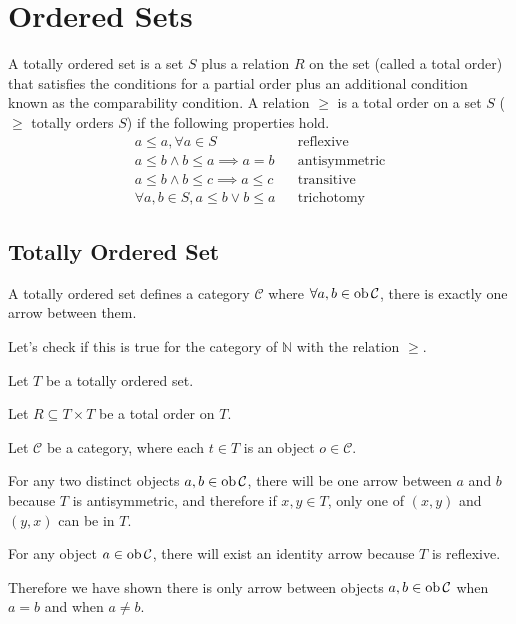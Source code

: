 \section{Ordered Sets}
\begin{definition}
A totally ordered set is a set $S$ plus a relation $R$ on the set (called a total
order) that satisfies the conditions for a partial order plus an additional
condition known as the comparability condition. A relation $\geq$ is a total order
on a set $S$ ($\geq$ totally orders $S$) if the following properties hold.
\setcounter{equation}{0}
\begin{align}
    a\leq a, \forall a \in S&&\text{reflexive}\\
    a\leq b \land b\leq a \implies a=b&&\text{antisymmetric}\\
    a\leq b \land b\leq c \implies a\leq c&&\text{transitive}\\
    \forall a,b \in S, a\leq b \lor b\leq a&&\text{trichotomy}
\end{align}
\end{definition}
\subsection{Totally Ordered Set}
A totally ordered set defines a category $\mathcal{C}$ where $\forall a, b \in
\text{ob}\thinspace\mathcal{C}{}$, there is exactly one arrow between them.
\begin{ttta}
Let's check if this is true for the category of $\mathbb{N}$ with the relation $\geq$.
\end{ttta}
\begin{proofitem}
\item Let $T$ be a totally ordered set.
\item Let $R\subseteq T\times T$ be a total order on $T$.
\item Let $\mathcal{C}$ be a category, where each $t\in T$ is an
    object $o\in\mathcal{C}$.
\item For any two distinct objects $a, b\in\text{ob}\thinspace\mathcal{C}{}$, there will be one arrow
    between $a$ and $b$ because $T$ is antisymmetric, and therefore if $x, y \in
    T$, only one of $(x, y)$ and $(y, x)$ can be in $T$.
\item For any object $a\in\text{ob}\thinspace\mathcal{C}{}$, there will exist an identity arrow because
    $T$ is reflexive.
\item Therefore we have shown there is only arrow between objects $a, b\in
    \text{ob}\thinspace\mathcal{C}{}$ when $a=b$ and when $a\neq b$.
\end{proofitem}


